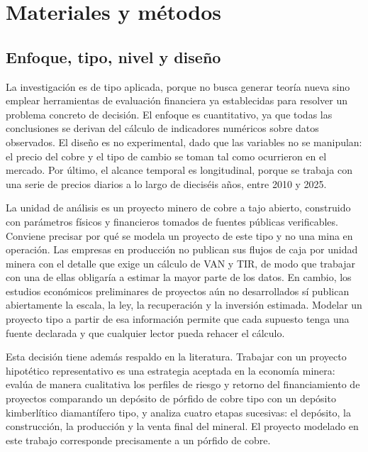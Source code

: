 %

\section{Materiales y métodos}

\subsection{Enfoque, tipo, nivel y diseño}

La investigación es de tipo aplicada, porque no busca generar teoría nueva sino
emplear herramientas de evaluación financiera ya establecidas para resolver un
problema concreto de decisión. El enfoque es cuantitativo, ya que todas las
conclusiones se derivan del cálculo de indicadores numéricos sobre datos
observados. El diseño es no experimental, dado que las variables no se
manipulan: el precio del cobre y el tipo de cambio se toman tal como ocurrieron
en el mercado. Por último, el alcance temporal es longitudinal, porque se trabaja
con una serie de precios diarios a lo largo de dieciséis años, entre 2010 y 2025.

La unidad de análisis es un proyecto minero de cobre a tajo abierto, construido
con parámetros físicos y financieros tomados de fuentes públicas verificables.
Conviene precisar por qué se modela un proyecto de este tipo y no una mina en
operación. Las empresas en producción no publican sus flujos de caja por unidad
minera con el detalle que exige un cálculo de VAN y TIR, de modo que trabajar con
una de ellas obligaría a estimar la mayor parte de los datos. En cambio, los
estudios económicos preliminares de proyectos aún no desarrollados sí publican
abiertamente la escala, la ley, la recuperación y la inversión estimada. Modelar
un proyecto tipo a partir de esa información permite que cada supuesto tenga una
fuente declarada y que cualquier lector pueda rehacer el cálculo.

Esta decisión tiene además respaldo en la literatura. Trabajar con un proyecto
hipotético representativo es una estrategia aceptada en la economía minera:
\textcite{cunningham2025} evalúa de manera cualitativa los perfiles de riesgo y
retorno del financiamiento de proyectos comparando un depósito de pórfido de cobre
tipo con un depósito kimberlítico diamantífero tipo, y analiza cuatro etapas
sucesivas: el depósito, la construcción, la producción y la venta final del mineral.
El proyecto modelado en este trabajo corresponde precisamente a un pórfido de cobre.

